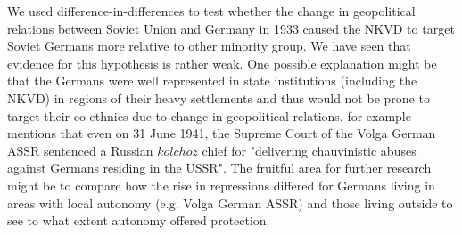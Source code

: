 We used difference-in-differences to test whether the change in geopolitical relations between Soviet Union and Germany in 1933 caused the NKVD to target Soviet Germans more relative to other minority group. We have seen that evidence for this hypothesis is rather weak. One possible explanation might be that the Germans were well represented in state institutions (including the NKVD) in regions of their heavy settlements and thus would not be prone to target their co-ethnics due to change in geopolitical relations. \citet[p. 126]{polian_against_2003} for example mentions that even on 31 June 1941, the Supreme Court of the Volga German ASSR sentenced a Russian $kolchoz$ chief for "delivering chauvinistic abuses against Germans residing in the USSR". The fruitful area for further research might be to compare how the rise in repressions differed for Germans living in areas with local autonomy (e.g. Volga German ASSR) and those living outside to see to what extent autonomy offered protection. 

